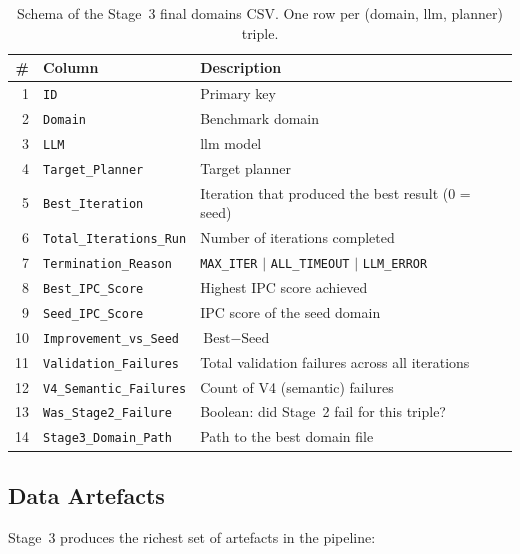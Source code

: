 \begin{table}[htbp]
  \centering
  \caption{Schema of the Stage~3 final domains CSV. One row per (domain, \gls{llm}, planner) triple.}
  \label{tab:stage3_final_csv}
  \small
  \begin{tabular}{r l p{7.5cm}}
    \toprule
    \textbf{\#} & \textbf{Column} & \textbf{Description} \\
    \midrule
    1 & \texttt{ID} & Primary key \\
    2 & \texttt{Domain} & Benchmark domain \\
    3 & \texttt{LLM} & \gls{llm} model \\
    4 & \texttt{Target\_Planner} & Target planner \\
    5 & \texttt{Best\_Iteration} & Iteration that produced the best result (0 = seed) \\
    6 & \texttt{Total\_Iterations\_Run} & Number of iterations completed \\
    7 & \texttt{Termination\_Reason} & \texttt{MAX\_ITER} $|$ \texttt{ALL\_TIMEOUT} $|$ \texttt{LLM\_ERROR} \\
    8 & \texttt{Best\_IPC\_Score} & Highest IPC score achieved \\
    9 & \texttt{Seed\_IPC\_Score} & IPC score of the seed domain \\
    10 & \texttt{Improvement\_vs\_Seed} & $\text{Best} - \text{Seed}$ \\
    11 & \texttt{Validation\_Failures} & Total validation failures across all iterations \\
    12 & \texttt{V4\_Semantic\_Failures} & Count of V4 (semantic) failures \\
    13 & \texttt{Was\_Stage2\_Failure} & Boolean: did Stage~2 fail for this triple? \\
    14 & \texttt{Stage3\_Domain\_Path} & Path to the best domain file \\
    \bottomrule
  \end{tabular}
\end{table}

\subsection{Data Artefacts}
\label{sec:design:stage3:data}

Stage~3 produces the richest set of artefacts in the pipeline:

